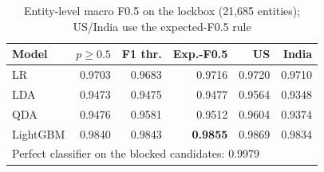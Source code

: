 \begin{table}[t]
\centering
\footnotesize
\caption{Entity-level macro F0.5 on the lockbox (21,685 entities); US/India use the expected-F0.5 rule}
\label{tab:entity}
\begin{tabular}{lrrrrr}
\toprule
Model & $p\ge0.5$ & F1 thr. & Exp.-F0.5 & US & India \\
\midrule
LR & 0.9703 & 0.9683 & 0.9716 & 0.9720 & 0.9710 \\
LDA & 0.9473 & 0.9475 & 0.9477 & 0.9564 & 0.9348 \\
QDA & 0.9476 & 0.9581 & 0.9512 & 0.9604 & 0.9374 \\
LightGBM & 0.9840 & 0.9843 & \textbf{0.9855} & 0.9869 & 0.9834 \\
\midrule
\multicolumn{6}{l}{Perfect classifier on the blocked candidates: 0.9979} \\
\bottomrule
\end{tabular}
\end{table}
